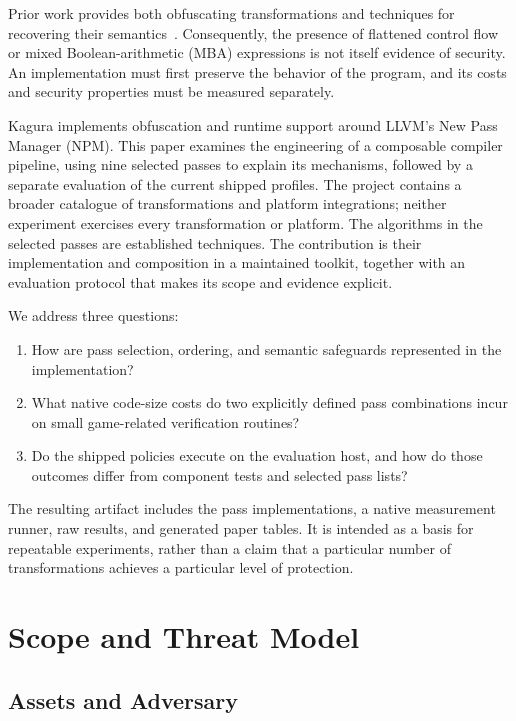 \documentclass[conference]{IEEEtran}
\begin{document}
Prior work provides both obfuscating transformations and techniques
for recovering their semantics~\cite{collberg1997taxonomy,junod2015obfuscator,
yadegari2015generic,blazytko2017syntia}. Consequently, the presence of
flattened control flow or mixed Boolean-arithmetic (MBA) expressions
is not itself evidence of security. An implementation must first
preserve the behavior of the program, and its costs and security
properties must be measured separately.

Kagura implements obfuscation and runtime support around LLVM's New
Pass Manager (NPM). This paper examines the engineering of a composable compiler pipeline,
using nine selected passes to explain its mechanisms, followed by a separate
evaluation of the current shipped profiles. The project contains a broader
catalogue of transformations and platform integrations; neither experiment
exercises every transformation or platform. The algorithms in the selected
passes are established techniques. The contribution is their
implementation and composition in a maintained toolkit, together with
an evaluation protocol that makes its scope and evidence explicit.

We address three questions:
\begin{enumerate}
  \item How are pass selection, ordering, and semantic safeguards
        represented in the implementation?
  \item What native code-size costs do two explicitly defined pass
        combinations incur on small game-related verification routines?
  \item Do the shipped policies execute on the evaluation host, and how do
        those outcomes differ from component tests and selected pass lists?
\end{enumerate}

The resulting artifact includes the pass implementations, a native
measurement runner, raw results, and generated paper tables. It is
intended as a basis for repeatable experiments, rather than a claim
that a particular number of transformations achieves a particular
level of protection.

\section{Scope and Threat Model}
\label{sec:threat}

\subsection{Assets and Adversary}
\end{document}
